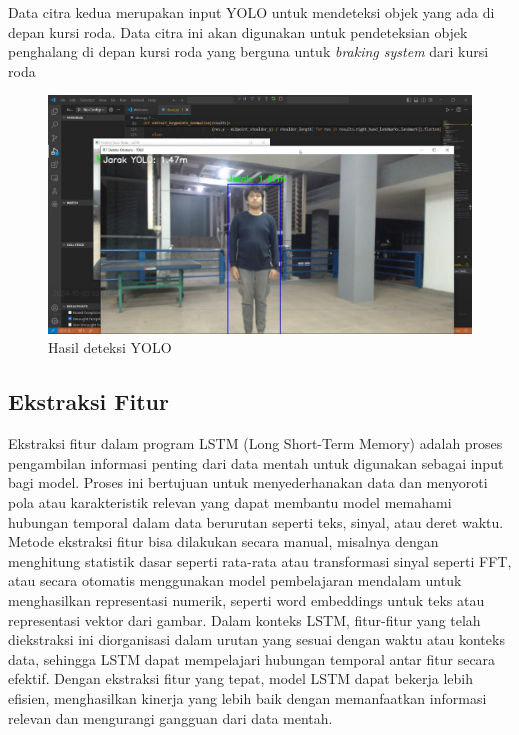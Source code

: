 Data citra kedua merupakan input YOLO untuk mendeteksi objek yang ada di depan kursi roda. Data citra ini akan digunakan untuk pendeteksian objek penghalang di depan kursi roda yang berguna untuk \emph{braking system} dari kursi roda
\begin{figure} [H] \centering
  \includegraphics[scale=0.35]{gambar/yolo.jpg}
  \caption{Hasil deteksi YOLO}
  \label{fig:citra yolo}
\end{figure}

\subsection{Ekstraksi Fitur}
Ekstraksi fitur dalam program LSTM (Long Short-Term Memory) adalah proses pengambilan informasi penting dari data mentah untuk digunakan sebagai input bagi model. Proses ini bertujuan untuk menyederhanakan data dan menyoroti pola atau karakteristik relevan yang dapat membantu model memahami hubungan temporal dalam data berurutan seperti teks, sinyal, atau deret waktu. Metode ekstraksi fitur bisa dilakukan secara manual, misalnya dengan menghitung statistik dasar seperti rata-rata atau transformasi sinyal seperti FFT, atau secara otomatis menggunakan model pembelajaran mendalam untuk menghasilkan representasi numerik, seperti word embeddings untuk teks atau representasi vektor dari gambar. Dalam konteks LSTM, fitur-fitur yang telah diekstraksi ini diorganisasi dalam urutan yang sesuai dengan waktu atau konteks data, sehingga LSTM dapat mempelajari hubungan temporal antar fitur secara efektif. Dengan ekstraksi fitur yang tepat, model LSTM dapat bekerja lebih efisien, menghasilkan kinerja yang lebih baik dengan memanfaatkan informasi relevan dan mengurangi gangguan dari data mentah.

